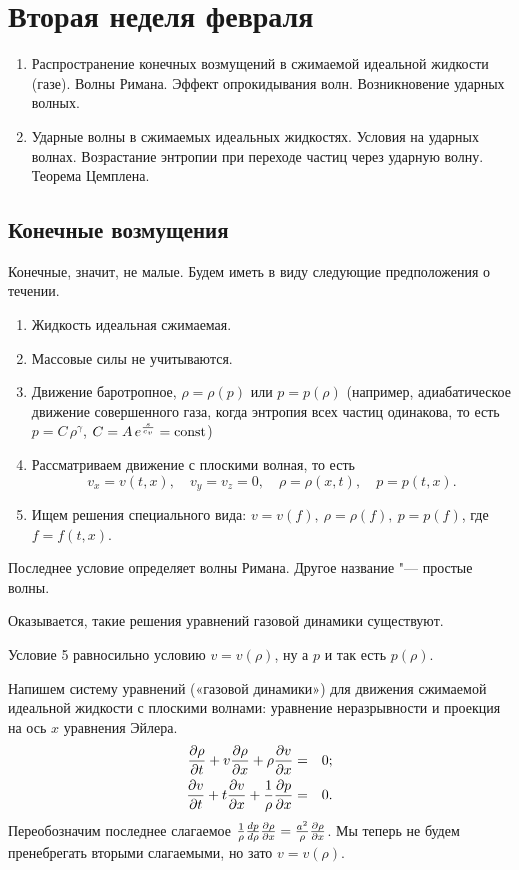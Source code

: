 \section{Вторая неделя февраля}
\begin{enumerate}
\item Распространение конечных возмущений в сжимаемой идеальной жидкости (газе). Волны Римана.
Эффект опрокидывания волн. Возникновение ударных волных.
\item  Ударные волны в сжимаемых идеальных жидкостях. Условия на ударных волнах. Возрастание энтропии при переходе частиц через ударную волну. Теорема Цемплена.
\end{enumerate}

\subsection{Конечные возмущения}
Конечные, значит, не малые. Будем иметь в виду следующие предположения о течении.
\begin{enumerate}
\item Жидкость идеальная сжимаемая.
\item Массовые силы не учитываются.
\item Движение баротропное, $\rho=\rho(p)$ или $p = p(\rho)$ (например, адиабатическое движение совершенного газа, когда энтропия всех частиц одинакова, то есть $p=C\,\rho^\gamma$, $C = A\,e^{\frac s{c_v}}=\operatorname{const}$)
\item Рассматриваем движение с плоскими волная, то есть
\[
  v_x = v(t,x),\quad v_y=v_z = 0,\quad \rho=\rho(x,t),\quad p=p(t,x).
\]
\item Ищем решения специального вида: $v = v(f),\ \rho=\rho(f),\ p=p(f)$, где $f=f(t,x)$.
\end{enumerate}
Последнее условие определяет волны Римана. Другое название "--- простые волны.

Оказывается, такие решения уравнений газовой динамики существуют.

Условие 5 равносильно условию $v=v(\rho)$, ну а $p$ и так есть $p(\rho)$.

Напишем систему уравнений («газовой динамики») для движения сжимаемой идеальной жидкости с плоскими волнами: уравнение неразрывности и проекция на ось $x$ уравнения Эйлера.
\begin{eqnarray*}
  \frac{\partial \rho}{\partial t} + v\frac{\partial \rho}{\partial x} + \rho \frac{\partial v}{\partial x}&=&0;\\
  \frac{\partial v}{\partial t} + t\frac{\partial v}{\partial x} + \frac 1\rho\frac{\partial p}{\partial x}&=&0.
\end{eqnarray*}
Переобозначим последнее слагаемое $\frac1\rho\frac{dp}{d\rho}\frac{\partial \rho}{\partial x} =\frac{a^2}\rho\frac{\partial \rho}{\partial x}$. Мы теперь не будем пренебрегать вторыми слагаемыми, но зато $v=v(\rho)$.

